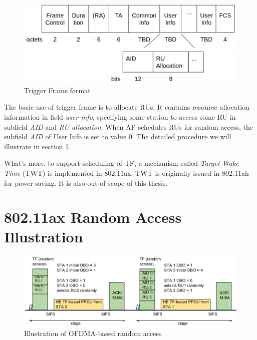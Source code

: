 \begin{figure}[!ht]
\centering
\includegraphics[scale=0.3]{./figure/chp2/fig_tf_format.png}
\caption{Trigger Frame format}
\label{fig_TF_format}
\end{figure}

The basic use of trigger frame is to allocate RUs. It contains resource allocation information in field \textit{user info}, specifying some station to access some RU in subfield \textit{AID} and \textit{RU allocation}.  
When AP schedules RUs for random access, the subfield \textit{AID} of User Info is set to value 0. The detailed procedure we will illustrate in section \ref{sec_RA_illu}. 

What's more, to support scheduling of TF, a mechanism called \textit{Target Wake Time} (TWT) is implemented in 802.11ax. TWT is originally issued in 802.11ah for power saving\cite{khorov2015survey}. It is also out of scope of this thesis.



\section{802.11ax Random Access Illustration}		\label{sec_RA_illu}
\begin{figure}[!t]
\centering
\includegraphics[scale=0.35]{./figure/chp2/RA_illu.png}
\caption{Illustration of OFDMA-based random access}
\label{fig_ra_illu}
\end{figure}

